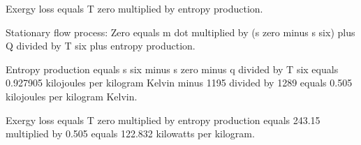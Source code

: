 Exergy loss equals T zero multiplied by entropy production.  

Stationary flow process:  
Zero equals m dot multiplied by (s zero minus s six) plus Q divided by T six plus entropy production.  

Entropy production equals s six minus s zero minus q divided by T six equals 0.927905 kilojoules per kilogram Kelvin minus 1195 divided by 1289 equals 0.505 kilojoules per kilogram Kelvin.  

Exergy loss equals T zero multiplied by entropy production equals 243.15 multiplied by 0.505 equals 122.832 kilowatts per kilogram.